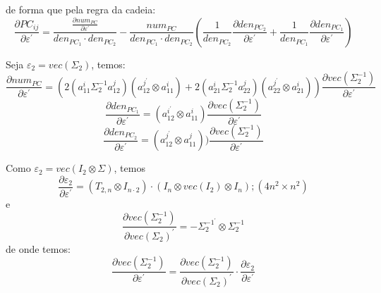 \documentclass[a4paper,10pt]{article}
\begin{document}
de forma que pela regra da cadeia:
\begin{equation}
\frac{\partial PC_{ij}}{\partial \varepsilon^{'}} = \frac{\frac{\partial num_{PC}}{\partial \varepsilon^{'}}}{den_{PC_{1}} \cdot den_{PC_{2}}} -
\frac{num_{PC}}{den_{PC_{1}} \cdot den_{PC_{2}}} \left( \frac{1}{den_{PC_{2}}} \frac{\partial den_{PC_{2}}}{\partial \varepsilon^{'}} +
 \frac{1}{den_{PC_{1}}} \frac{\partial den_{PC_{1}}}{\partial \varepsilon^{'}}  \right) 
\end{equation}

Seja $\varepsilon_{2} = vec(\Sigma_{2})$, temos:
\begin{equation}
\frac{\partial num_{PC}}{\partial \varepsilon^{'}} = (2 (a_{11}^{i} \Sigma_{2}^{-1} a_{12}^{j}) (a_{12}^{j^{'}} \otimes a_{11}^{i}) +
2 (a_{21}^{i} \Sigma_{2}^{-1} a_{22}^{j}) (a_{22}^{j^{'}} \otimes a_{21}^{i}) )
\frac{\partial vec(\Sigma_{2}^{-1})}{\partial \varepsilon^{'}}
\end{equation}
\begin{equation}
\frac{\partial den_{PC_{1}}}{\partial \varepsilon^{'}} = (a_{12}^{i^{'}} \otimes a_{11}^{i}) 
\frac{\partial vec(\Sigma_{2}^{-1})}{\partial \varepsilon^{'}}
\end{equation}
\begin{equation}
\frac{\partial den_{PC_{2}}}{\partial \varepsilon^{'}} = (a_{12}^{j^{'}} \otimes a_{11}^{j}) )
\frac{\partial vec(\Sigma_{2}^{-1})}{\partial \varepsilon^{'}}
\end{equation}

Como $\varepsilon_{2} = vec(I_{2} \otimes \Sigma)$, temos
\begin{equation}
\frac{\partial \varepsilon_{2}}{\partial \varepsilon^{'}} = (T_{2,n} \otimes I_{n \cdot 2}) \cdot (I_{n} \otimes vec(I_{2}) \otimes I_{n}); (4n^{2} \times n^{2})
\end{equation}
e
\begin{equation}
\frac{\partial vec(\Sigma_{2}^{-1})}{\partial vec(\Sigma_{2})^{'}} = -\Sigma_{2}^{-1^{'}} \otimes \Sigma_{2}^{-1}
\end{equation}
de onde temos:
\begin{equation}
\frac{\partial vec(\Sigma_{2}^{-1})}{\partial \varepsilon^{'}} = \frac{\partial vec(\Sigma_{2}^{-1})}{\partial vec(\Sigma_{2})^{'}} \cdot \frac{\partial \varepsilon_{2}}{\partial \varepsilon^{'}}
\end{equation}
\end{document}
